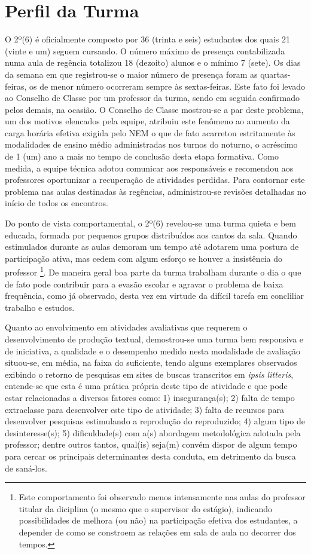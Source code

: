 \section{Perfil da Turma} %
\label{sec:Perfil da Turma}

O 2º(6) é oficialmente composto por 36 (trinta e seis) estudantes dos quais 21 (vinte e um) seguem cursando. O número máximo de presença contabilizada numa aula de regência totalizou 18 (dezoito) alunos e o mínimo 7 (sete). Os dias da semana em que registrou-se o maior número de presença foram as quartas-feiras, os de menor número ocorreram sempre às sextas-feiras. Este fato foi levado ao Conselho de Classe por um professor da turma, sendo em seguida confirmado pelos demais, na ocasião. O Conselho de Classe mostrou-se a par deste problema, um dos motivos elencados pela equipe, atribuiu este fenômeno ao aumento da carga horária efetiva exigida pelo \ac{NEM} o que de fato acarretou estritamente às modalidades de ensino médio administradas nos turnos do noturno, o acréscimo de 1 (um) ano a mais no tempo de conclusão desta etapa formativa. Como medida, a equipe técnica adotou comunicar aos responsáveis e recomendou aos professores oportunizar a recuperação de atividades perdidas. Para contornar este problema nas aulas destinadas às regências, administrou-se revisões detalhadas no início de todos os encontros.

Do ponto de vista comportamental, o 2º(6) revelou-se uma turma quieta e bem educada, formada por pequenos grupos distribuídos aos cantos da sala. Quando estimulados durante as aulas demoram um tempo até adotarem uma postura de participação ativa, mas cedem com algum esforço se houver a insistência do professor \footnote{Este comportamento foi observado menos intensamente nas aulas do professor titular da diciplina (o mesmo que o supervisor do estágio), indicando possibilidades de melhora (ou não) na participação efetiva dos estudantes, a depender de como se constroem as relações em sala de aula no decorrer dos tempos.}. De maneira geral boa parte da turma trabalham durante o dia o que de fato pode contribuir para a evasão escolar e agravar o problema de baixa frequência, como já observado, desta vez em virtude da difícil tarefa em concliliar trabalho e estudos. 

Quanto ao envolvimento em atividades avaliativas que requerem o desenvolvimento de produção textual, demostrou-se uma turma bem responsiva e de iniciativa, a qualidade e o desempenho medido nesta modalidade de avaliação situou-se, em média, na faixa do suficiente, tendo alguns exemplares observados exibindo o retorno de pesquisas em sites de buscas transcritos em \textit{ipsis litteris}, entende-se que esta é uma prática própria deste tipo de atividade e que pode estar relacionadas a diversos fatores como: 1) insegurança(s); 2) falta de tempo extraclasse para desenvolver este tipo de atividade; 3) falta de recursos para desenvolver pesquisas estimulando a reprodução do reproduzido; 4) algum tipo de desinteresse(s); 5) dificuldade(s) com a(s) abordagem metodológica adotada pela professor; dentre outros tantos, qual(is) seja(m) convém dispor de algum tempo para cercar os principais determinantes desta conduta, em detrimento da busca de  saná-los.

